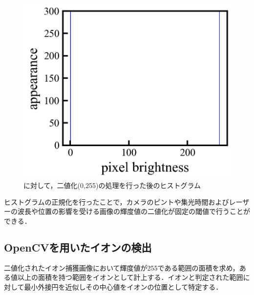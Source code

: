 \begin{figure}[h]
\begin{center}
\begin{minipage}{0.3\linewidth}
			\includegraphics[width=0.98\columnwidth]{./theory/figure/5/binary_2.jpg}
		\end{minipage}
	\end{center}
	\caption{に対して，二値化(0,255)の処理を行った後のヒストグラム}
	\label{fig:binary_hist}
\end{figure}

ヒストグラムの正規化を行ったことで，カメラのピントや集光時間およびレーザーの波長や位置の影響を受ける画像の輝度値の二値化が固定の閾値で行うことができる．

\subsection{OpenCVを用いたイオンの検出}
二値化されたイオン捕獲画像において輝度値が255である範囲の面積を求め，ある値以上の面積を持つ範囲をイオンとして計上する．イオンと判定された範囲に対して最小外接円を近似しその中心値をイオンの位置として特定する．

